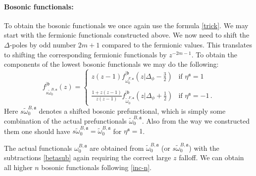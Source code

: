 \documentclass[12pt]{article}
\numberwithin{equation}{section}
\newcommand{\be}{\begin{equation}}
\newcommand{\ee}{\end{equation}}
\def\D{\Delta}
\newcommand{\mf}[1]{\mathfrak #1}
\begin{document}
	\paragraph{Bosonic functionals:}  
 To obtain the bosonic functionals we once again use the formula \eqref{trick}. We may start with the fermionic functionals constructed above. We now need to shift the  $\D$-poles by odd number $2m+1$ compared to the fermionic values. This translates to shifting the corresponding fermionic functionals by $z^{-2m-1}$.  To obtain the components of the lowest bosonic functionals we may do the following:
	\be
	f^{|\mf b}_{s\tilde \omega^{B,\mf a}_{0}}(z)=\begin{cases}z(z-1) f^{|\mf b}_{\omega^{F,\mf a}_{0}}(z| \D_\phi-\frac 32) & \text{if } \eta^{\mf a}=1\\ \\ 
		\frac{1+z(z-1)}{z(z-1)}f^{|\mf b}_{\tilde \omega^{F,\mf a}_{0}}(z| \D_\phi+\frac 12) & \text{if } \eta^{\mf a}=-1\,. \end{cases}
	\ee
	Here $s\tilde \omega^{B,\mf a}_{0}$ denotes a shifted bosonic prefunctional, which is simply some combination of the actual prefunctionals $\tilde \omega^{B,\mf a}_{0}$. Also from the way we constructed them one should have  $s\tilde \omega^{B,\mf a}_{0}=\tilde \omega^{B,\mf a}_{0}$ for $\eta^{\mf a}=1$.
	
	The actual functionals $\omega^{B,\mf a}_{0}$ are obtained from $\tilde \omega^{B,\mf a}_{0}$ (or $s\tilde \omega^{B,\mf a}_{0}$) with the subtractions \eqref{betasub} again requiring the correct large $z$ falloff. We can obtain all higher $n$ bosonic functionals following \eqref{inc-n}. 
	
	
	
\end{document}
